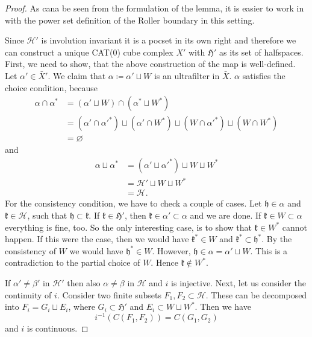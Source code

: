 \begin{proof}
  As cana be seen from the formulation of the lemma, it is easier to work in with the power set definition of the Roller boundary in this setting.

  Since \(\mathcal{H}'\) is involution invariant it is a pocset in its own right and therefore we can construct a unique CAT(0) cube complex \(X'\) with \(\mathfrak{H}'\) as its set of halfspaces. First, we need to show, that the above construction of the map is well-defined. Let \(\alpha' \in \bar X'\). We claim that \(\alpha \coloneqq \alpha' \sqcup W\) is an ultrafilter in \(\bar X\). \(\alpha\) satisfies the choice condition, because
  \begin{align*}
    \alpha \cap \alpha^\ast
    & = (\alpha' \sqcup W) \cap (\alpha^\ast \sqcup W^\ast)\\
    & = (\alpha' \cap \alpha'^\ast) \sqcup (\alpha' \cap W^\ast) \sqcup (W \cap \alpha'^\ast) \sqcup (W \cap W^\ast)\\
    & = \varnothing
  \end{align*}
  and
  \begin{align*}
    \alpha \sqcup \alpha^\ast
    & = (\alpha' \sqcup \alpha'^\ast) \sqcup W \sqcup W^\ast\\
    & = \mathcal{H}' \sqcup W \sqcup W^\ast\\
    & = \mathcal{H}.
  \end{align*}
  For the consistency condition, we have to check a couple of cases. Let \(\mathfrak{h} \in \alpha\) and \(\mathfrak{k} \in \mathcal{H}\), such that \(\mathfrak{h} \subset \mathfrak{k}\). If \(\mathfrak{k} \in \mathfrak{H}'\), then \(\mathfrak{k} \in \alpha' \subset \alpha\) and we are done. If \(\mathfrak{k} \in W \subset \alpha\) everything is fine, too. So the only interesting case, is to show that \(\mathfrak{k} \in W^\ast\) cannot happen. If this were the case, then we would have \(\mathfrak{k}^\ast \in W\) and \(\mathfrak{k}^\ast \subset \mathfrak{h}^\ast\). By the consistency of \(W\) we would have \(\mathfrak{h}^\ast \in W\). However, \(\mathfrak{h} \in \alpha = \alpha' \sqcup W\). This is a contradiction to the partial choice of \(W\). Hence \(\mathfrak{k} \notin W^\ast\).

  If \(\alpha' \neq \beta'\) in \(\mathcal{H}'\) then also \(\alpha \neq \beta\) in \(\mathcal{H}\) and \(i\) is injective. Next, let us consider the continuity of \(i\). Consider two finite subsets \(F_1, F_2 \subset \mathcal{H}\). These can be decomposed into \(F_i = G_i \sqcup E_i\), where \(G_i \subset \mathfrak{H}'\) and \(E_i \subset W \sqcup W^\ast\). Then we have
  \[
    i^{-1}(C(F_1, F_2)) = C(G_1, G_2)
  \]
  and \(i\) is continuous.


\end{proof}
